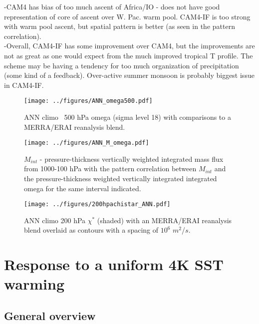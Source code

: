 \documentclass[letterpaper,12pt,titlepage,oneside,final]{book}
\begin{document}
-CAM4 has bias of too much ascent of Africa/IO - does not have good representation of core of ascent over W. Pac. warm pool. CAM4-IF is too strong with warm pool ascent, but spatial pattern is better (as seen in the pattern correlation).
\\
-Overall, CAM4-IF has some improvement over CAM4, but the improvements are not as great as one would expect from the much improved tropical T profile. The scheme may be having a tendency for too much organization of precipitation (some kind of a feedback). Over-active summer monsoon is probably biggest issue in CAM4-IF.
\\
\begin{figure}[H]
\centering
\noindent\texttt{[image: ../figures/ANN\_omega500.pdf]}\hfill
\caption{ANN climo ~500 hPa omega (sigma level 18) with comparisons to a MERRA/ERAI reanalysis blend.}
\end{figure}
\begin{figure}[H]
\centering
\noindent\texttt{[image: ../figures/ANN\_M\_omega.pdf]}\hfill
\caption{$M_{int}$ - pressure-thickness vertically weighted integrated mass flux from 1000-100 hPa with the pattern correlation between $M_{int}$ and the pressure-thickness weighted vertically integrated integrated omega for the same interval indicated.}
\end{figure}
\newpage
\begin{figure}[H]
\centering
\noindent\texttt{[image: ../figures/200hpachistar\_ANN.pdf]}\hfill
\caption{ANN climo 200 hPa $\chi^{*}$ (shaded) with an MERRA/ERAI reanalysis blend overlaid as contours with a spacing of $10^{6}$ $m^{2}$/$s$.}
\end{figure}
\section{Response to a uniform 4K SST warming}

\subsection{General overview}
\end{document}
